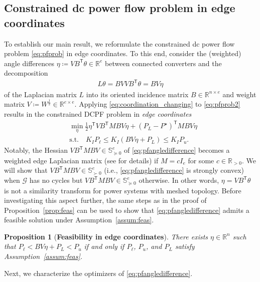 \documentclass[twocolumn,twoside,journal]{IEEEtran}
\newcommand{\mc}{\mathcal}
\newtheorem{proposition}{Proposition}
\begin{document}
\subsection{Constrained dc power flow problem in edge coordinates}
To establish our main result, we reformulate the constrained dc power flow problem \eqref{eq:pfprob} in edge coordinates. To this end, consider the (weighted) angle differences  $\eta \coloneqq VB^\mathsf{T} \theta \in \mathbb{R}^{e}$ between connected converters and the decomposition
\begin{align}\label{eq:coordination_changing}
    L\theta = BV V B^\mathsf{T} \theta = BV \eta
\end{align}
of the Laplacian matrix $L$ into its oriented incidence matrix $B \in \mathbb{R}^{n \times e}$ and weight matrix $V \coloneqq W^{\frac{1}{2}} \in \mathbb{R}^{e \times e}$. Applying  \eqref{eq:coordination_changing} to \eqref{eq:pfprob2} results in the constrained DCPF problem in \emph{edge coordinates} 
\begin{subequations}\label{eq:pfangledifference}
\begin{align}
    &\min_\eta \tfrac{1}{2} \eta^\mathsf{T} V B^\mathsf{T} M BV\eta  +\left(P_L-P^\star\right)^{\mathsf{T}} M BV\eta   \\ 
    & \text{s.t.} \quad K_I P_{\ell} \leq K_I (BV\eta+P_L)  \leq K_I P_u.\end{align}
\end{subequations}
Notably, the Hessian $V B^\mathsf{T} M BV \in \mathbb{S}^{e}_{\succeq 0}$ of \eqref{eq:pfangledifference} becomes a weighted edge Laplacian matrix (see \cite{ZM2011,ZB2014} for details) if $M=c I_e$ for some $c \in \mathbb{R}_{>0}$. We will show that $V B^\mathsf{T} M BV \in \mathbb{S}^{e}_{\succ 0}$ (i.e., \eqref{eq:pfangledifference} is strongly convex) when $\mc G$ has no cycles but $V B^\mathsf{T} M BV \in \mathbb{S}^{e}_{\succeq 0}$ otherwise. In other words, $\eta = VB^\mathsf{T} \theta$ is not a similarity transform for power systems with meshed topology. Before investigating this aspect further, the same steps as in the proof of Proposition~\ref{prop:feas} can be used to show that \eqref{eq:pfangledifference} admits a feasible solution under Assumption~\ref{assum:feas}.
%
\begin{proposition}[\textbf{Feasibility in edge coordinates}]\label{prop:feasdiff}
    There exists $\eta \in \mathbb{R}^n$ such that $P_{\ell} < B V \eta + P_{L} < P_{u}$ if and only if $P_\ell$, $P_u$, and $P_L$ satisfy Assumption~\ref{assum:feas}.
\end{proposition}
Next, we characterize the optimizers of \eqref{eq:pfangledifference}.
\end{document}
